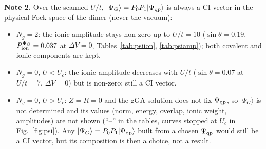 \documentclass[11pt]{article}
\newcommand{\Ng}{N_{g}}
\newcommand{\dV}{\Delta V}
\begin{document}
\textbf{Note 2.} Over the scanned $U/t$, $|\Psi_G\rangle=P_0P_1|\Psi_{\rm qp}\rangle$ is always a CI vector in the physical Fock space of the dimer (never the vacuum):
\begin{itemize}[nosep]
  \item $\Ng=2$: the ionic amplitude stays non-zero up to $U/t=10$ ($\sin\theta=0.19$, $P_{\rm ion}^{\bar\Psi_G}=0.037$ at $\dV=0$, Tables~\ref{tab:psiion}, \ref{tab:psiamp}); both covalent and ionic components are kept.
  \item $\Ng=0$, $U<U_c$: the ionic amplitude decreases with $U/t$ ($\sin\theta=0.07$ at $U/t=7$, $\dV=0$) but is non-zero; still a CI vector.
  \item $\Ng=0$, $U>U_c$: $Z=R=0$ and the gGA solution does not fix $\Psi_{\rm qp}$, so $|\Psi_G\rangle$ is not determined and its values (norm, energy, overlap, ionic weight, amplitudes) are not shown (``--'' in the tables, curves stopped at $U_c$ in Fig.~\ref{fig:psi}). Any $|\Psi_G\rangle=P_0P_1|\Psi_{\rm qp}\rangle$ built from a chosen $\Psi_{\rm qp}$ would still be a CI vector, but its composition is then a choice, not a result.
\end{itemize}
\end{document}
